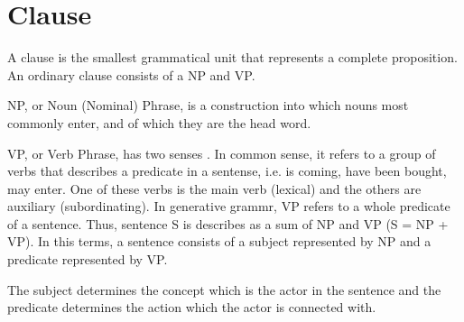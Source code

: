 \section{Clause}

A clause is the smallest grammatical unit that represents a complete proposition. An ordinary clause consists of a NP and VP.

NP, or Noun (Nominal) Phrase, is a construction into which nouns most commonly enter, and of which they are the head word. \cite{lang-dict}

VP, or Verb Phrase, has two senses \cite{lang-dict}. In common sense, it refers to a group of verbs that describes a predicate in a sentense, i.e. is coming, have been bought, may enter. One of these verbs is the main verb (lexical) and the others are auxiliary (subordinating). In generative grammr, VP refers to a whole predicate of a sentence. Thus, sentence S is describes as a sum of NP and VP (S = NP + VP). In this terms, a sentence consists of a subject represented by NP and a predicate represented by VP.

The subject determines the concept which is the actor in the sentence and the predicate determines the action which the actor is connected with.



